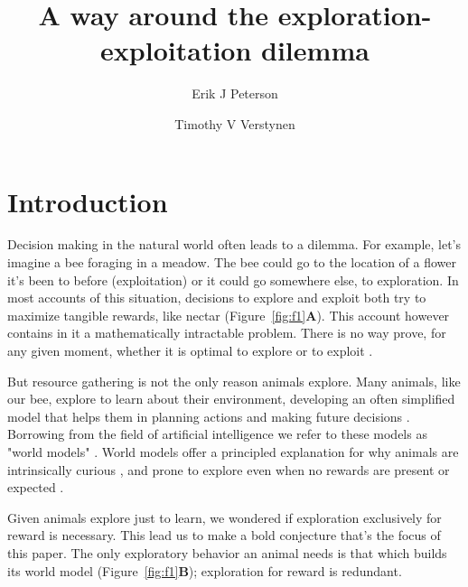 \documentclass[fleqn,10pt]{wlscirep}
\title{A way around the exploration-exploitation dilemma}
\author[1,2*]{Erik J Peterson}
\author[2,3,4]{Timothy V Verstynen}
\affil[1]{Department of Psychology}
\affil[2]{Center for the Neural Basis of Cognition}
\affil[3]{Carnegie Mellon Neuroscience Institute}
\affil[4]{Biomedical Engineering, Carnegie Mellon University, Pittsburgh PA}
\affil[*]{Erik.Exists@gmail.com}
\begin{document}
\flushbottom
\maketitle

\thispagestyle{empty}
\linenumbers
\section*{Introduction}
Decision making in the natural world often leads to a dilemma. For example, let's imagine a bee foraging in a meadow. The bee could go to the location of a flower it's been to before (exploitation) or it could go somewhere else, to exploration. In most accounts of this situation, decisions to explore and exploit both try to maximize tangible rewards, like nectar \cite{Sutton2018} (Figure~\ref{fig:f1}\textbf{A}). This account however contains in it a mathematically intractable problem. There is no way prove, for any given moment, whether it is optimal to explore or to exploit \cite{Thrun1992a,Dayan1996,Findling2018,Gershman2018b}.    

But resource gathering is not the only reason animals explore. Many animals, like our bee, explore to learn about their environment, developing an often simplified model that helps them in planning actions and making future decisions \cite{Ahilan2019,Poucet1993}. Borrowing from the field of artificial intelligence we refer to these models as "world models" \cite{Schmidhuber2019,Sutton2018,Schmidhuber1991}. World models offer a principled explanation for why animals are intrinsically curious \cite{Mehlhorn2015,Gupta2006,Berger-Tal2014,Gottlieb2018,Schwartenbeck2019,Pathak2017}, and prone to explore even when no rewards are present or expected \cite{Hughes1997}. %

Given animals explore just to learn, we wondered if exploration exclusively for reward is necessary. This lead us to make a bold conjecture that's the focus of this paper. The only exploratory behavior an animal needs is that which builds its world model (Figure~\ref{fig:f1}\textbf{B}); exploration for reward is redundant.
\end{document}
